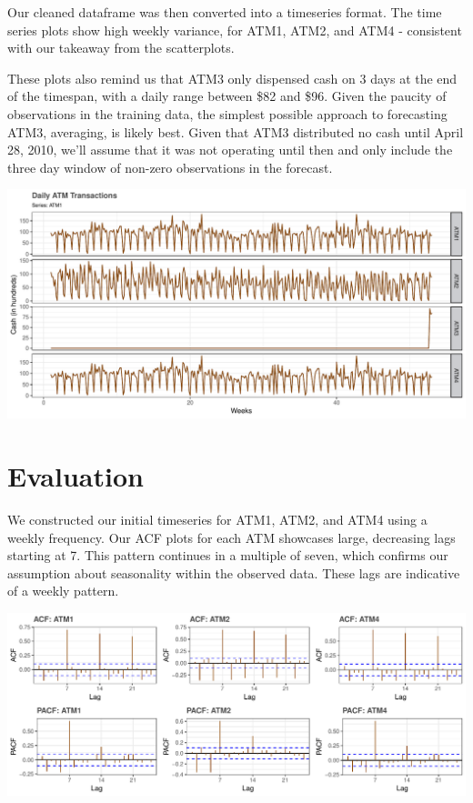 \documentclass[openany]{book}
\begin{document}
Our cleaned dataframe was then converted into a timeseries format. The
time series plots show high weekly variance, for ATM1, ATM2, and ATM4 -
consistent with our takeaway from the scatterplots.

These plots also remind us that ATM3 only dispensed cash on 3 days at
the end of the timespan, with a daily range between \$82 and \$96. Given
the paucity of observations in the training data, the simplest possible
approach to forecasting ATM3, averaging, is likely best. Given that ATM3
distributed no cash until April 28, 2010, we'll assume that it was not
operating until then and only include the three day window of non-zero
observations in the forecast.

\includegraphics{Group2_Project1_Fall2019_files/figure-latex/unnamed-chunk-4-1.pdf}

\hypertarget{evaluation}{%
\section{Evaluation}\label{evaluation}}

We constructed our initial timeseries for ATM1, ATM2, and ATM4 using a
weekly frequency. Our ACF plots for each ATM showcases large, decreasing
lags starting at 7. This pattern continues in a multiple of seven, which
confirms our assumption about seasonality within the observed data.
These lags are indicative of a weekly pattern. \newline

\includegraphics{Group2_Project1_Fall2019_files/figure-latex/unnamed-chunk-5-1.pdf}
\end{document}
